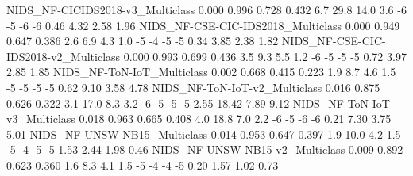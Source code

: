 NIDS_NF-CICIDS2018-v3_Multiclass                                         0.000      0.996       0.728      0.432                   6.7                  29.8                   14.0                   3.6              -6              -5               -6              -6               0.46               4.32                2.58               1.96
NIDS_NF-CSE-CIC-IDS2018_Multiclass                                       0.000      0.949       0.647      0.386                   2.6                   6.9                    4.3                   1.0              -5              -4               -5              -5               0.34               3.85                2.38               1.82
NIDS_NF-CSE-CIC-IDS2018-v2_Multiclass                                    0.000      0.993       0.699      0.436                   3.5                   9.3                    5.5                   1.2              -6              -5               -5              -5               0.72               3.97                2.85               1.85
NIDS_NF-ToN-IoT_Multiclass                                               0.002      0.668       0.415      0.223                   1.9                   8.7                    4.6                   1.5              -5              -5               -5              -5               0.62               9.10                3.58               4.78
NIDS_NF-ToN-IoT-v2_Multiclass                                            0.016      0.875       0.626      0.322                   3.1                  17.0                    8.3                   3.2              -6              -5               -5              -5               2.55              18.42                7.89               9.12
NIDS_NF-ToN-IoT-v3_Multiclass                                            0.018      0.963       0.665      0.408                   4.0                  18.8                    7.0                   2.2              -6              -5               -6              -6               0.21               7.30                3.75               5.01
NIDS_NF-UNSW-NB15_Multiclass                                             0.014      0.953       0.647      0.397                   1.9                  10.0                    4.2                   1.5              -5              -4               -5              -5               1.53               2.44                1.98               0.46
NIDS_NF-UNSW-NB15-v2_Multiclass                                          0.009      0.892       0.623      0.360                   1.6                   8.3                    4.1                   1.5              -5              -4               -4              -5               0.20               1.57                1.02               0.73

